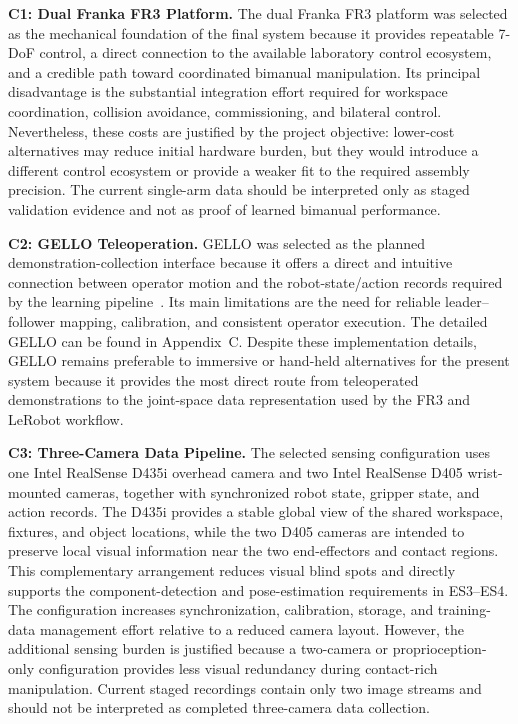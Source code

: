 \documentclass[12pt, letterpaper]{article}
\begin{document}
\noindent\textbf{C1: Dual Franka FR3 Platform.}
  The dual Franka FR3 platform was selected as the mechanical foundation of the final system because it provides
  repeatable 7-DoF control, a direct connection to the available laboratory control ecosystem, and a credible path
  toward coordinated bimanual manipulation. Its principal disadvantage is the substantial integration effort required
  for workspace coordination, collision avoidance, commissioning, and bilateral control. Nevertheless, these costs are
  justified by the project objective: lower-cost alternatives may reduce initial hardware burden, but they would
  introduce a different control ecosystem or provide a weaker fit to the required assembly precision. The current
  single-arm data should be interpreted only as staged validation evidence and not as proof of learned bimanual
  performance.

  \noindent\textbf{C2: GELLO Teleoperation.}
  GELLO was selected as the planned demonstration-collection interface because it offers a direct and intuitive
  connection between operator motion and the robot-state/action records required by the learning pipeline~\cite{gello}.
  Its main limitations are the need for reliable leader--follower mapping, calibration, and consistent operator
  execution. The detailed GELLO can be found in Appendix~C. Despite these implementation details, GELLO remains preferable to immersive or hand-held alternatives
  for the present system because it provides the most direct route from teleoperated demonstrations to the joint-space
  data representation used by the FR3 and LeRobot workflow.

  \noindent\textbf{C3: Three-Camera Data Pipeline.}
  The selected sensing configuration uses one Intel RealSense D435i overhead camera and two Intel RealSense D405 wrist-
  mounted cameras, together with synchronized robot state, gripper state, and action records. The D435i provides a stable
  global view of the shared workspace, fixtures, and object locations, while the two D405 cameras are intended to
  preserve local visual information near the two end-effectors and contact regions. This complementary arrangement
  reduces visual blind spots and directly supports the component-detection and pose-estimation requirements in ES3--ES4.
  The configuration increases synchronization, calibration, storage, and training-data management effort relative to a
  reduced camera layout. However, the additional sensing burden is justified because a two-camera or proprioception-only
  configuration provides less visual redundancy during contact-rich manipulation. Current staged recordings contain only
  two image streams and should not be interpreted as completed three-camera data collection.
\end{document}
